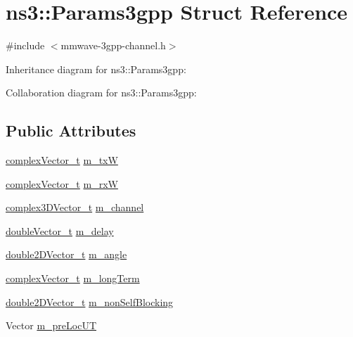 \hypertarget{structns3_1_1Params3gpp}{}\section{ns3\+:\+:Params3gpp Struct Reference}
\label{structns3_1_1Params3gpp}


{\ttfamily \#include $<$mmwave-\/3gpp-\/channel.\+h$>$}



Inheritance diagram for ns3\+:\+:Params3gpp\+:


Collaboration diagram for ns3\+:\+:Params3gpp\+:
\subsection*{Public Attributes}
\begin{DoxyCompactItemize}
\item 
\hyperlink{namespacens3_a6a7f75817ae50e6ac47414955b17d926}{complex\+Vector\+\_\+t} \hyperlink{structns3_1_1Params3gpp_a7cadacd3315d352f1d7e91632caa9234}{m\+\_\+txW}
\item 
\hyperlink{namespacens3_a6a7f75817ae50e6ac47414955b17d926}{complex\+Vector\+\_\+t} \hyperlink{structns3_1_1Params3gpp_a1ade49c28d4ed5bae7bc08039d8050f8}{m\+\_\+rxW}
\item 
\hyperlink{namespacens3_afbc512ea4e4657e80b7ac44f78fc81ad}{complex3\+D\+Vector\+\_\+t} \hyperlink{structns3_1_1Params3gpp_abe21a9afb77539505171163a8a05d3e0}{m\+\_\+channel}
\item 
\hyperlink{namespacens3_aa6f1edf6566ca6afec613bc6e40240ea}{double\+Vector\+\_\+t} \hyperlink{structns3_1_1Params3gpp_aeb004cf7f30de8d04a706c296ec2b3b6}{m\+\_\+delay}
\item 
\hyperlink{namespacens3_a908ae777c72964ccedbcf2310527a67e}{double2\+D\+Vector\+\_\+t} \hyperlink{structns3_1_1Params3gpp_a637bea98c3009972b92ec45189afe810}{m\+\_\+angle}
\item 
\hyperlink{namespacens3_a6a7f75817ae50e6ac47414955b17d926}{complex\+Vector\+\_\+t} \hyperlink{structns3_1_1Params3gpp_a27f8a617252cc3834657c483dc8a5f3b}{m\+\_\+long\+Term}
\item 
\hyperlink{namespacens3_a908ae777c72964ccedbcf2310527a67e}{double2\+D\+Vector\+\_\+t} \hyperlink{structns3_1_1Params3gpp_acd435060eaed360dc8c6256eb540dc55}{m\+\_\+non\+Self\+Blocking}
\item 
Vector \hyperlink{structns3_1_1Params3gpp_a798c6d908152a2590826923c20eaa2c1}{m\+\_\+pre\+Loc\+UT}
\item 

\end{DoxyCompactItemize}
